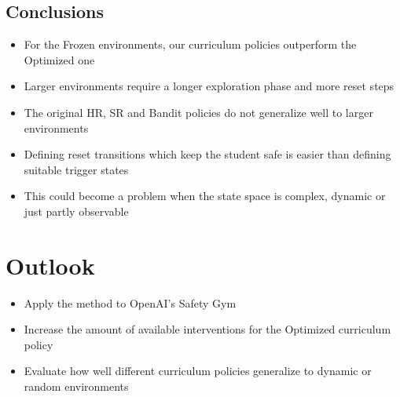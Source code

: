\documentclass[a0,portrait]{a0poster}
\begin{document}
\begin{multicols}{3}
\begin{tcolorbox}[width=0.95\linewidth,colback={conclusion},frame empty,boxsep=1cm]
\section{Conclusions}

\begin{itemize}
    \item For the Frozen environments, our curriculum policies outperform the Optimized one
    \item Larger environments require a longer exploration phase and more reset steps
    \item The original HR, SR and Bandit policies do not generalize well to larger environments
    \item Defining reset transitions which keep the student safe is easier than defining suitable trigger states
    \item This could become a problem when the state space is complex, dynamic or just partly observable
\end{itemize}

\end{tcolorbox}


\section{Outlook}

\color{primary}
\begin{itemize}
    \item Apply the method to \mbox{OpenAI's} Safety Gym
    \item Increase the amount of available interventions for the Optimized curriculum policy
    \item Evaluate how well different curriculum policies generalize to dynamic or random environments
\end{itemize}
\color{Black}

\singlespacing
\small
\nocite{*} %


\end{multicols}
\end{document}
